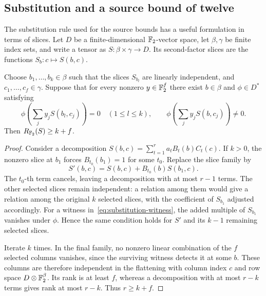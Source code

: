 \subsection{Substitution and a source bound of twelve}
\label{app:source-substitution}
The substitution rule used for the source bounds has a useful
formulation in terms of slices. Let $D$ be a finite-dimensional
$\mathbb F_2$-vector space, let $\beta,\gamma$ be finite index sets, and write
a tensor as $S:\beta\times\gamma\to D$. Its second-factor slices
are the functions $S_b:c\mapsto S(b,c)$.

\begin{lemma}
\label{lem:source-substitution}
Choose $b_1,\ldots,b_k\in\beta$ such that the slices $S_{b_l}$
are linearly independent, and $c_1,\ldots,c_f\in\gamma$.
Suppose that for every nonzero $y\in\mathbb F_2^f$ there exist $b\in\beta$
and $\phi\in D^*$ satisfying
\begin{equation}\label{eq:substitution-witness}
 \phi\left(\sum_j y_j S(b_l,c_j)\right)=0\quad(1\leq l\leq k),
 \qquad
 \phi\left(\sum_j y_j S(b,c_j)\right)\ne0.
\end{equation}
Then $R_{\mathbb F_2}(S)\geq k+f$.
\end{lemma}
\begin{proof}
Consider a decomposition $S(b,c)=\sum_{t=1}^r a_t B_t(b)C_t(c)$.
If $k>0$, the nonzero slice at $b_1$ forces $B_{t_0}(b_1)=1$
for some $t_0$.
Replace the slice family by
\[
 S'(b,c)=S(b,c)+B_{t_0}(b)S(b_1,c).
\]
The $t_0$-th term cancels, leaving a decomposition with at most $r-1$
terms. The other selected slices remain independent: a relation among
them would give a relation among the original $k$ selected slices,
with the coefficient of $S_{b_1}$ adjusted accordingly.
For a witness in~\eqref{eq:substitution-witness}, the added multiple
of $S_{b_1}$ vanishes under $\phi$. Hence the same condition holds
for $S'$ and its $k-1$ remaining selected slices.

Iterate $k$ times. In the final family, no nonzero linear combination
of the $f$ selected columns vanishes, since the surviving witness
detects it at some $b$. These columns are therefore independent in
the flattening with column index $c$ and row space $D\otimes\mathbb F_2^\beta$.
Its rank is at least $f$, whereas a decomposition with at most $r-k$
terms gives rank at most $r-k$. Thus $r\geq k+f$.
\end{proof}

